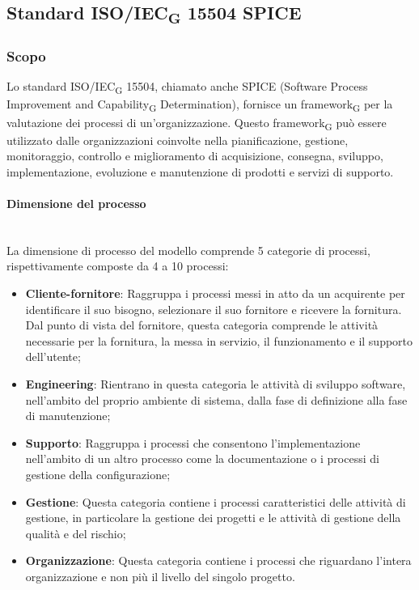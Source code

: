 \subsection{Standard ISO/IEC\textsubscript{G} 15504 SPICE}
\subsubsection{Scopo}
Lo standard ISO/IEC\textsubscript{G} 15504, chiamato anche SPICE (Software Process Improvement and Capability\textsubscript{G} Determination), fornisce un framework\textsubscript{G} per la valutazione dei processi di un'organizzazione. Questo framework\textsubscript{G} può essere utilizzato dalle organizzazioni coinvolte nella pianificazione, gestione, monitoraggio, controllo e miglioramento di acquisizione, consegna, sviluppo, implementazione, evoluzione e manutenzione di prodotti e servizi di supporto.
\paragraph {Dimensione del processo}\mbox{}\\
La dimensione di processo del modello comprende 5 categorie di processi, rispettivamente composte da 4 a 10 processi:
\begin{itemize}
	\item \textbf{Cliente-fornitore}: Raggruppa i processi messi in atto da un acquirente per identificare il suo bisogno, selezionare il suo fornitore e ricevere la fornitura. Dal punto di vista del fornitore, questa categoria comprende le attività necessarie per la fornitura, la messa in servizio, il funzionamento e il supporto dell'utente;
	\item \textbf{Engineering}: Rientrano in questa categoria le attività di sviluppo software, nell'ambito del proprio ambiente di sistema, dalla fase di definizione alla fase di manutenzione;
	\item \textbf{Supporto}: Raggruppa i processi che consentono l'implementazione nell'ambito di un altro processo come la documentazione o i processi di gestione della configurazione;
	\item \textbf{Gestione}: Questa categoria contiene i processi caratteristici delle attività di gestione, in particolare la gestione dei progetti e le attività di gestione della qualità e  del rischio;
	\item \textbf{Organizzazione}: Questa categoria contiene i processi che riguardano l'intera organizzazione e non più il livello del singolo progetto.
\end{itemize}
